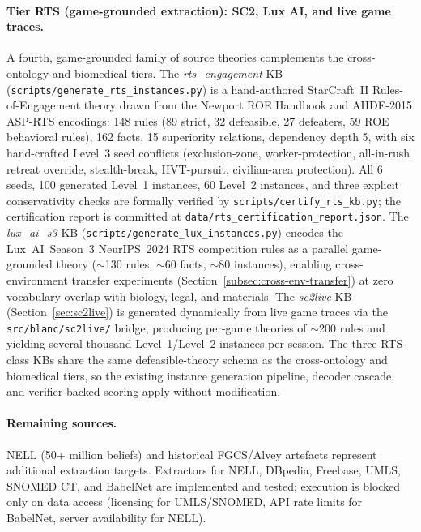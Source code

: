 \documentclass{article}
\theoremstyle{definition}
\begin{document}
\paragraph{Tier RTS (game-grounded extraction): SC2, Lux AI, and live game traces.}
A fourth, game-grounded family of source theories complements the cross-ontology and biomedical tiers. The \emph{rts\_engagement} KB (\texttt{scripts/generate\_rts\_instances.py}) is a hand-authored StarCraft~II Rules-of-Engagement theory drawn from the Newport ROE Handbook and AIIDE-2015 ASP-RTS encodings: 148 rules (89 strict, 32 defeasible, 27 defeaters, 59 ROE behavioral rules), 162 facts, 15 superiority relations, dependency depth 5, with six hand-crafted Level~3 seed conflicts (exclusion-zone, worker-protection, all-in-rush retreat override, stealth-break, HVT-pursuit, civilian-area protection). All 6 seeds, 100 generated Level~1 instances, 60 Level~2 instances, and three explicit conservativity checks are formally verified by \texttt{scripts/certify\_rts\_kb.py}; the certification report is committed at \texttt{data/rts\_certification\_report.json}. The \emph{lux\_ai\_s3} KB (\texttt{scripts/generate\_lux\_instances.py}) encodes the Lux~AI~Season~3 NeurIPS~2024 RTS competition rules as a parallel game-grounded theory ($\sim$130 rules, $\sim$60 facts, $\sim$80 instances), enabling cross-environment transfer experiments (Section~\ref{subsec:cross-env-transfer}) at zero vocabulary overlap with biology, legal, and materials. The \emph{sc2live} KB (Section~\ref{sec:sc2live}) is generated dynamically from live game traces via the \texttt{src/blanc/sc2live/} bridge, producing per-game theories of $\sim$200 rules and yielding several thousand Level~1/Level~2 instances per session. The three RTS-class KBs share the same defeasible-theory schema as the cross-ontology and biomedical tiers, so the existing instance generation pipeline, decoder cascade, and verifier-backed scoring apply without modification.

\paragraph{Remaining sources.}
NELL \cite{carlson2010nell} (50+ million beliefs) and historical FGCS/Alvey artefacts represent additional extraction targets. Extractors for NELL, DBpedia, Freebase, UMLS, SNOMED CT, and BabelNet are implemented and tested; execution is blocked only on data access (licensing for UMLS/SNOMED, API rate limits for BabelNet, server availability for NELL).
\end{document}
